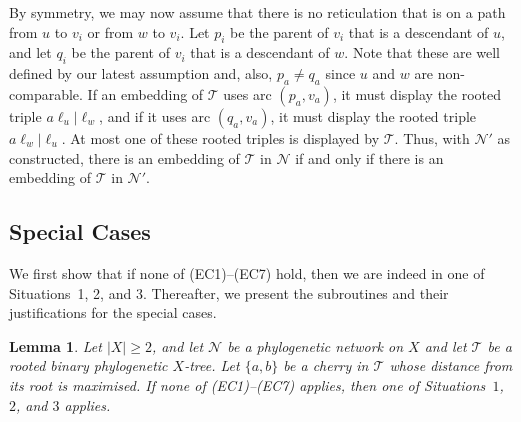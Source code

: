 \documentclass[11pt]{amsart}
\newtheorem{lemma}[theorem]{Lemma}
\begin{document}
By symmetry, we may now assume that there is no reticulation that is on a path from $u$ to $v_i$ or from $w$ to $v_i$. Let $p_i$ be the parent of $v_i$ that is a descendant of $u$, and let $q_i$ be the parent of $v_i$ that is a descendant of $w$. Note that these are well defined by our latest assumption and, also, $p_a\neq q_a$ since $u$ and $w$ are non-comparable. If an embedding of ${{\mathcal T}}$ uses arc $(p_a,v_a)$, it must display the rooted triple $a\ell_u|\ell_w$, and if it uses arc $(q_a,v_a)$, it must display the rooted triple $a\ell_w|\ell_u$. At most one of these rooted triples is displayed by ${{\mathcal T}}$. Thus, with ${{\mathcal N}}'$ as constructed, there is an embedding of ${{\mathcal T}}$ in ${{\mathcal N}}$ if and only if there is an embedding of ${{\mathcal T}}$ in ${{\mathcal N}}'$.

\subsection{Special Cases}\label{specialcasealgs}
We first show that if none of (EC1)--(EC7) hold, then we are indeed in one of Situations~1, 2, and 3. Thereafter, we present the subroutines and their justifications for the special cases.

\begin{lemma}\label{inspecialcase}
Let $|X|\ge 2$, and let ${{\mathcal N}}$ be a phylogenetic network on $X$ and let ${{\mathcal T}}$ be a rooted binary phylogenetic $X$-tree. Let $\{a, b\}$ be a cherry in ${{\mathcal T}}$ whose distance from its root is maximised. If none of {\rm (EC1)--(EC7)} applies, then one of Situations~$1$, $2$, and $3$ applies.
\end{lemma}
\end{document}

